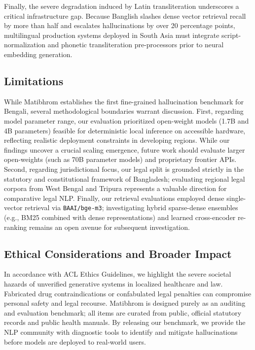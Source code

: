 \documentclass[11pt,a4paper,twocolumn]{article}
\begin{document}
Finally, the severe degradation induced by Latin transliteration underscores a critical infrastructure gap. Because Banglish slashes dense vector retrieval recall by more than half and escalates hallucinations by over 20 percentage points, multilingual production systems deployed in South Asia must integrate script-normalization and phonetic transliteration pre-processors prior to neural embedding generation.

\subsection{Limitations}
While Matibhrom establishes the first fine-grained hallucination benchmark for Bengali, several methodological boundaries warrant discussion. First, regarding model parameter range, our evaluation prioritized open-weight models (1.7B and 4B parameters) feasible for deterministic local inference on accessible hardware, reflecting realistic deployment constraints in developing regions. While our findings uncover a crucial scaling emergence, future work should evaluate larger open-weights (such as 70B parameter models) and proprietary frontier APIs. Second, regarding jurisdictional focus, our legal split is grounded strictly in the statutory and constitutional framework of Bangladesh; evaluating regional legal corpora from West Bengal and Tripura represents a valuable direction for comparative legal NLP. Finally, our retrieval evaluations employed dense single-vector retrieval via \texttt{BAAI/bge-m3}; investigating hybrid sparse-dense ensembles (e.g., BM25 combined with dense representations) and learned cross-encoder re-ranking remains an open avenue for subsequent investigation.

\subsection{Ethical Considerations and Broader Impact}
In accordance with ACL Ethics Guidelines, we highlight the severe societal hazards of unverified generative systems in localized healthcare and law. Fabricated drug contraindications or confabulated legal penalties can compromise personal safety and legal recourse. Matibhrom is designed purely as an auditing and evaluation benchmark; all items are curated from public, official statutory records and public health manuals. By releasing our benchmark, we provide the NLP community with diagnostic tools to identify and mitigate hallucinations before models are deployed to real-world users.
\end{document}
